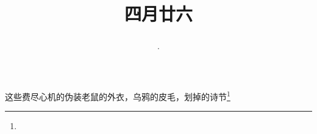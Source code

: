 \title{\date[d=2,m=6,y=2024][year:cn-y,年,month:cn,day:cn,日,·,weekday]·四月廿六 }
这些费尽心机的伪装老鼠的外衣，乌鸦的皮毛，划掉的诗节\footnote{ }

